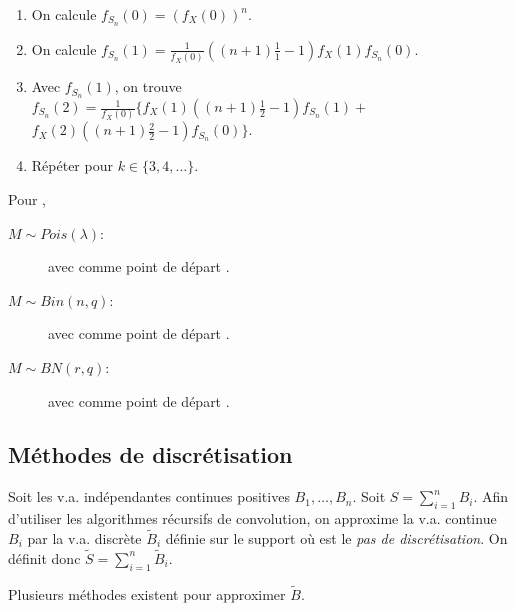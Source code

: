 \documentclass[10pt, french]{article}
\begin{document}
\begin{multicols*}{2}
\begin{algo2}
\begin{enumerate}
	\item	On calcule $f_{S_{n}}(0)	=	\left(f_{X}(0)\right)^{n}$.
	\item	On calcule $f_{S_{n}}(1)	=	\frac{1}{f_{X}(0)} \left((n + 1)\frac{1}{1} - 1\right)f_{X}(1)f_{S_{n}}(0)$.
	\item	Avec $f_{S_{n}}(1)$, on trouve $f_{S_{n}}(2)	=	\frac{1}{f_{X}(0)} \bigg\{ f_{X}(1)\left((n + 1)\frac{1}{2} - 1\right)f_{S_{n}}(1)	+$ $ f_{X}(2)\left((n + 1)\frac{2}{2} - 1\right)f_{S_{n}}(0) \bigg\}$.
	\item	Répéter pour $k \in \{3, 4, \dots\}$.
\end{enumerate}
\end{algo2}

Pour , 
\begin{description}
	\item[$M \sim Pois(\lambda)$:]	 avec comme point de départ .
	\item[$M \sim Bin(n, q)$:]	 avec comme point de départ .
	\item[$M \sim BN(r, q)$:]	 avec comme point de départ .
\end{description}


\columnbreak
\subsection{Méthodes de discrétisation}
Soit les v.a. indépendantes continues positives $B_{1}, \dots, B_{n}$.
Soit $S	=	\sum_{i	=	1}^{n}B_{i}$.
Afin d'utiliser les algorithmes récursifs de convolution, on approxime la v.a. continue $B_{i}$ par la v.a. discrète $\tilde{B}_{i}$ définie sur le support  où  est le \textit{pas de discrétisation}.
On définit donc $\tilde{S}	=	\sum_{i	=	1}^{n}\tilde{B}_{i}$.

Plusieurs méthodes existent pour approximer $\tilde{B}$.



\end{multicols*}
\end{document}
